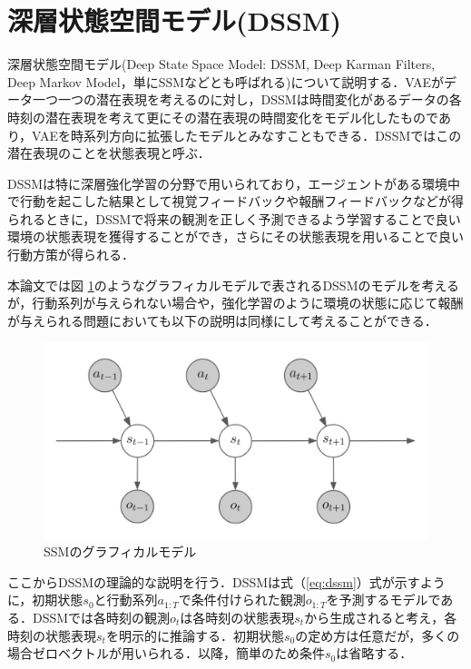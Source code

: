 \clearpage
\section{深層状態空間モデル(DSSM)}
\label{section:dssm}

深層状態空間モデル(Deep State Space Model: DSSM, Deep Karman Filters, Deep Markov Model，単にSSMなどとも呼ばれる)\cite{krishnan2015deep}\cite{krishnan2017structured}について説明する．VAEがデータ一つ一つの潜在表現を考えるのに対し，DSSMは時間変化があるデータの各時刻の潜在表現を考えて更にその潜在表現の時間変化をモデル化したものであり，VAEを時系列方向に拡張したモデルとみなすこともできる．DSSMではこの潜在表現のことを状態表現と呼ぶ．

DSSMは特に深層強化学習の分野で用いられており，エージェントがある環境中で行動を起こした結果として視覚フィードバックや報酬フィードバックなどが得られるときに，DSSMで将来の観測を正しく予測できるよう学習することで良い環境の状態表現を獲得することができ，さらにその状態表現を用いることで良い行動方策が得られる\cite{hafner2019dream}．

\vspace{\baselineskip}
本論文では図 \ref{fig:ssm}のようなグラフィカルモデルで表されるDSSMのモデルを考えるが，行動系列が与えられない場合や，強化学習のように環境の状態に応じて報酬が与えられる問題においても以下の説明は同様にして考えることができる．

\begin{figure}[bp]
  \begin{center}
    \includegraphics[width=\linewidth]{./figures/dssm.png}
    \caption{SSMのグラフィカルモデル}
    \label{fig:ssm}
  \end{center}
\end{figure}

\vspace{\baselineskip}
ここからDSSMの理論的な説明を行う．DSSMは式（\ref{eq:dssm}）式が示すように，初期状態$s_0$と行動系列$a_{1:T}$で条件付けられた観測$o_{1:T}$を予測するモデルである．DSSMでは各時刻の観測$o_t$は各時刻の状態表現$s_t$から生成されると考え，各時刻の状態表現$s_t$を明示的に推論する．初期状態$s_0$の定め方は任意だが，多くの場合ゼロベクトルが用いられる．以降，簡単のため条件$s_0$は省略する．

